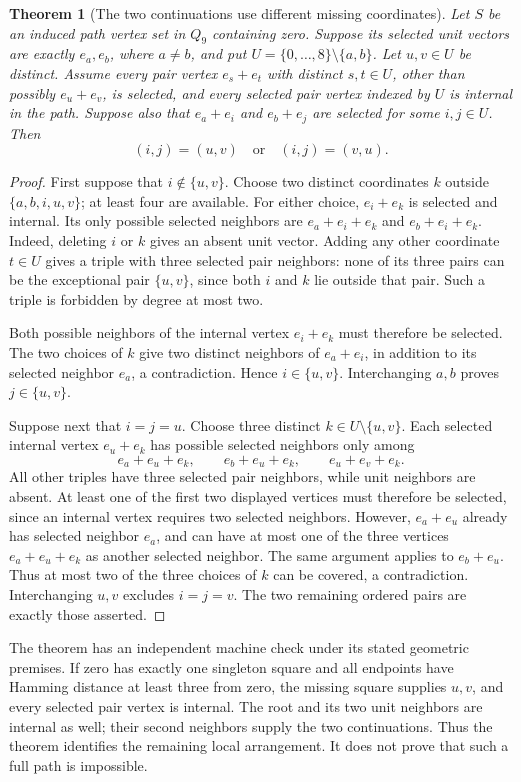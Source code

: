 \documentclass[11pt,a4paper]{article}
\newtheorem{theorem}{Theorem}[section]
\theoremstyle{definition}
\theoremstyle{remark}
\newcommand{\Q}{Q}
\begin{document}
\begin{theorem}[The two continuations use different missing coordinates]\label{thm:split-arms}
Let $S$ be an induced path vertex set in $\Q_9$ containing zero. Suppose its selected unit vectors are exactly $e_a,e_b$, where $a\ne b$, and put $U=\{0,\ldots,8\}\setminus\{a,b\}$. Let $u,v\in U$ be distinct. Assume every pair vertex $e_s+e_t$ with distinct $s,t\in U$, other than possibly $e_u+e_v$, is selected, and every selected pair vertex indexed by $U$ is internal in the path. Suppose also that $e_a+e_i$ and $e_b+e_j$ are selected for some $i,j\in U$. Then
\[
(i,j)=(u,v)\quad\text{or}\quad(i,j)=(v,u).
\]
\end{theorem}
\begin{proof}
First suppose that $i\notin\{u,v\}$. Choose two distinct coordinates $k$ outside $\{a,b,i,u,v\}$; at least four are available. For either choice, $e_i+e_k$ is selected and internal. Its only possible selected neighbors are $e_a+e_i+e_k$ and $e_b+e_i+e_k$. Indeed, deleting $i$ or $k$ gives an absent unit vector. Adding any other coordinate $t\in U$ gives a triple with three selected pair neighbors: none of its three pairs can be the exceptional pair $\{u,v\}$, since both $i$ and $k$ lie outside that pair. Such a triple is forbidden by degree at most two.

Both possible neighbors of the internal vertex $e_i+e_k$ must therefore be selected. The two choices of $k$ give two distinct neighbors of $e_a+e_i$, in addition to its selected neighbor $e_a$, a contradiction. Hence $i\in\{u,v\}$. Interchanging $a,b$ proves $j\in\{u,v\}$.

Suppose next that $i=j=u$. Choose three distinct $k\in U\setminus\{u,v\}$. Each selected internal vertex $e_u+e_k$ has possible selected neighbors only among
\[
e_a+e_u+e_k,\qquad e_b+e_u+e_k,\qquad e_u+e_v+e_k.
\]
All other triples have three selected pair neighbors, while unit neighbors are absent. At least one of the first two displayed vertices must therefore be selected, since an internal vertex requires two selected neighbors. However, $e_a+e_u$ already has selected neighbor $e_a$, and can have at most one of the three vertices $e_a+e_u+e_k$ as another selected neighbor. The same argument applies to $e_b+e_u$. Thus at most two of the three choices of $k$ can be covered, a contradiction. Interchanging $u,v$ excludes $i=j=v$. The two remaining ordered pairs are exactly those asserted.
\end{proof}

The theorem has an independent machine check under its stated geometric premises. If zero has exactly one singleton square and all endpoints have Hamming distance at least three from zero, the missing square supplies $u,v$, and every selected pair vertex is internal. The root and its two unit neighbors are internal as well; their second neighbors supply the two continuations. Thus the theorem identifies the remaining local arrangement. It does not prove that such a full path is impossible.
\end{document}
